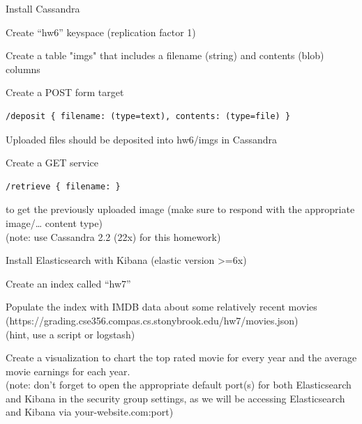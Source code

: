 \documentclass[fancy,11pt,titlestyle=display]{style/elegantbook}
\begin{document}
\begin{problemset}
\item Install Cassandra
\item Create ``hw6'' keyspace (replication factor 1)
\item Create a table "imgs" that includes a filename (string) and contents (blob) columns
\item Create a POST form target
\begin{lstlisting}
/deposit { filename: (type=text), contents: (type=file) }
\end{lstlisting}
Uploaded files should be deposited into hw6/imgs in Cassandra
\item Create a GET service
\begin{lstlisting}
/retrieve { filename: }
\end{lstlisting}
to get the previously uploaded image (make sure to respond with the appropriate image/… content type)\\
(note: use Cassandra 2.2 (22x) for this homework)
\end{problemset}

\begin{problemset}
\item Install Elasticsearch with Kibana (elastic version >=6x)
\item Create an index called ``hw7''
\item Populate the index with IMDB data about some relatively recent movies\\
(https://grading.cse356.compas.cs.stonybrook.edu/hw7/movies.json)\\
(hint, use a script or logstash)
\item Create a visualization to chart the top rated movie for every year and the average movie earnings for each year.\\
(note: don't forget to open the appropriate default port(s) for both Elasticsearch and Kibana in the security group settings, as we will be accessing Elasticsearch and Kibana via your-website.com:port)
\end{problemset}
\end{document}
